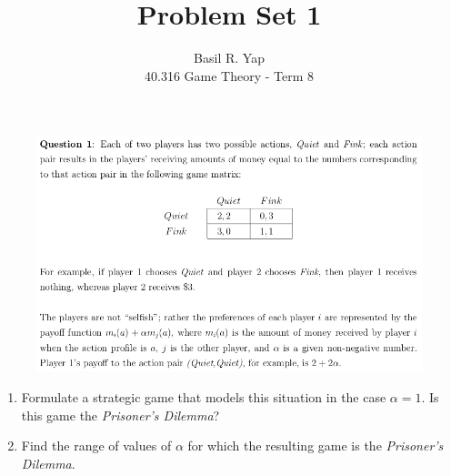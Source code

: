 \documentclass[12pt]{article}
\begin{document}
 
 
\title{Problem Set 1}%
\author{Basil R. Yap\\ %
40.316 Game Theory - Term 8} %
 
\maketitle

\begin{figure}[h!]
\includegraphics[width=\linewidth]{./assets/201805201632.png}
\end{figure}

\begin{enumerate}[label=\alph*)]
\item Formulate a strategic game that models this situation in the case $\alpha = 1$. Is this game the \textit{Prisoner’s Dilemma}?
\item Find the range of values of $\alpha$ for which the resulting game is the \textit{Prisoner’s Dilemma}.
\end{enumerate}
\end{document}
